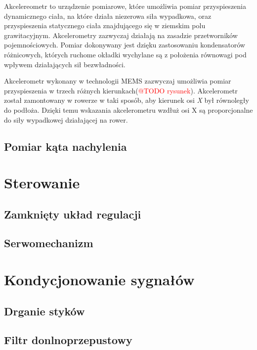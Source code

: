 Akcelereometr to urządzenie pomiarowe, które umożliwia pomiar przyspieszenia dynamicznego ciała, na które działa niezerowa siła wypadkowa, oraz przyspieszenia statycznego ciała znajdującego się w ziemskim polu grawitacyjnym. Akcelerometry zazwyczaj działają na zasadzie przetworników pojemnościowych. Pomiar dokonywany jest dzięku zastosowaniu kondensatorów różnicowych, których ruchome okładki wychylane są z położenia równowagi pod wpływem działających sił bezwładności.

Akcelerometr wykonany w technologii MEMS zazwyczaj umożliwia pomiar przyspieszenia w trzech różnych kierunkach(\textcolor{red}{@TODO rysunek}). Akcelerometr został zamontowany w rowerze w taki sposób, aby kierunek osi \textit{X} był równoległy do podłoża. Dzięki temu wskazania akcelerometru wzdłuż osi X są proporcjonalne do siły wypadkowej działającej na rower.



\subsection{Pomiar kąta nachylenia}

\section{Sterowanie}


\subsection{Zamknięty układ regulacji}
\subsection{Serwomechanizm}

\section{Kondycjonowanie sygnałów}


\subsection{Drganie styków}
\subsection{Filtr donlnoprzepustowy}